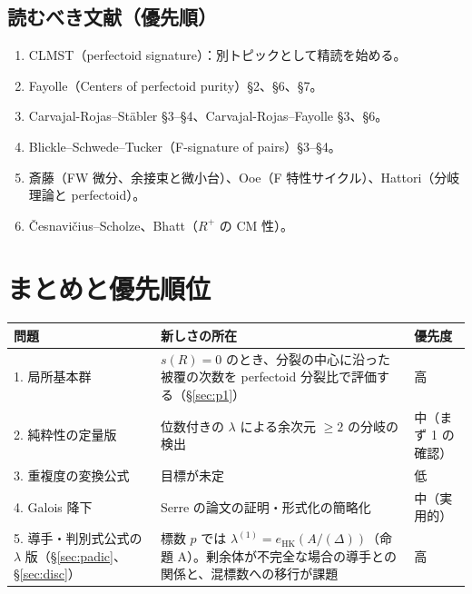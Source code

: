 \documentclass[11pt,a4paper]{ltjsarticle}
\theoremstyle{plain}
\theoremstyle{definition}
\theoremstyle{remark}
\theoremstyle{plain}
\newcommand{\eHK}{e_{\mathrm{HK}}}
\begin{document}
\subsection{読むべき文献（優先順）}
\begin{enumerate}
  \item CLMST（perfectoid signature）：別トピックとして精読を始める。
  \item Fayolle（Centers of perfectoid purity）§2、§6、§7。
  \item Carvajal-Rojas--Stäbler §3--§4、Carvajal-Rojas--Fayolle §3、§6。
  \item Blickle--Schwede--Tucker（F-signature of pairs）§3--§4。
  \item 斎藤（FW 微分、余接束と微小台）、Ooe（F 特性サイクル）、Hattori（分岐理論と perfectoid）。
  \item Česnavičius--Scholze、Bhatt（$R^+$ の CM 性）。
\end{enumerate}

\section{まとめと優先順位}

\begin{center}
\small
\begin{tabularx}{\textwidth}{>{\raggedright}p{3.2cm}>{\raggedright}X>{\raggedright\arraybackslash}p{2.4cm}}
\toprule
問題 & 新しさの所在 & 優先度 \\
\midrule
1. 局所基本群 & $s(R) = 0$ のとき、分裂の中心に沿った被覆の次数を perfectoid 分裂比で評価する（\S\ref{sec:p1}） & 高 \\
2. 純粋性の定量版 & 位数付きの $\lambda$ による余次元 $\ge2$ の分岐の検出 & 中（まず 1 の確認） \\
3. 重複度の変換公式 & 目標が未定 & 低 \\
4. Galois 降下 & Serre の論文の証明・形式化の簡略化 & 中（実用的） \\
5. 導手・判別式公式の $\lambda$ 版（\S\ref{sec:padic}、\S\ref{sec:disc}） & 標数 $p$ では $\lambda^{(1)} = \eHK(A/(\Delta))$（命題 A）。剰余体が不完全な場合の導手との関係と、混標数への移行が課題 & 高 \\
\bottomrule
\end{tabularx}
\end{center}
\end{document}
